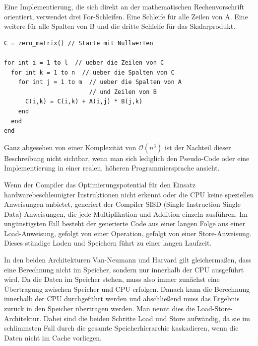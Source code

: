 Eine Implementierung, die sich direkt an der mathematischen Rechenvorschrift orientiert, verwendet drei For-Schleifen. Eine Schleife für alle Zeilen von A. Eine weitere für alle Spalten von B und die dritte Schleife für das Skalarprodukt.

\begin{lstlisting}[style=PseudoLang,caption={Matrixmultiplikation Iterativ},captionpos=b]
C = zero_matrix() // Starte mit Nullwerten

for int i = 1 to l  // ueber die Zeilen von C
  for int k = 1 to n  // ueber die Spalten von C
    for int j = 1 to m  // ueber die Spalten von A
                        // und Zeilen von B
      C(i,k) = C(i,k) + A(i,j) * B(j,k)
    end
  end
end
\end{lstlisting}


Ganz abgesehen von einer Komplexität von $\mathcal{O}(n^3)$ ist der Nachteil dieser Beschreibung nicht sichtbar, wenn man sich lediglich den Pseudo-Code oder eine Implementierung in einer realen, höheren Programmiersprache ansieht.


Wenn der Compiler das Optimierungspotential für den Einsatz hardwarebeschleunigter Instruktionen nicht erkennt oder die CPU keine speziellen Anweisungen anbietet, generiert der Compiler \gls{SISD} (Single Instruction Single Data)-Anweisungen, die jede Multiplikation und Addition einzeln ausführen. Im ungünstigsten Fall besteht der generierte Code aus einer langen Folge aus einer Load-Anweisung, gefolgt von einer Operation, gefolgt von einer Store-Anweisung. Dieses ständige Laden und Speichern führt zu einer langen Laufzeit.

In den beiden Architekturen Van-Neumann und Harvard gilt gleichermaßen, dass eine Berechnung nicht im Speicher, sondern nur innerhalb der CPU ausgeführt wird. Da die Daten im Speicher stehen, muss also immer zunächst eine Übertragung zwischen Speicher und CPU erfolgen. Danach kann die Berechnung innerhalb der CPU durchgeführt werden und abschließend muss das Ergebnis zurück in den Speicher übertragen werden. Man nennt dies die Load-Store-Architektur. Dabei sind die beiden Schritte Load und Store aufwändig, da sie im schlimmsten Fall durch die gesamte Speicherhierarchie kaskadieren, wenn die Daten nicht im Cache vorliegen.

